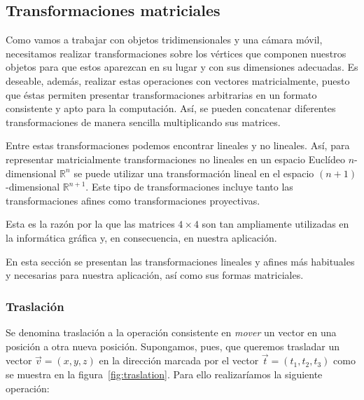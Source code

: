 \subsection{Transformaciones matriciales}
\label{makereference5.4.1}

Como vamos a trabajar con objetos tridimensionales y una cámara móvil,
necesitamos realizar transformaciones sobre los vértices que componen nuestros
objetos para que estos aparezcan en su lugar y con sus dimensiones adecuadas.
Es deseable, además, realizar estas operaciones con vectores matricialmente,
puesto que éstas permiten presentar transformaciones arbitrarias en un
formato consistente y apto para la computación. Así, se pueden concatenar
diferentes transformaciones de manera sencilla multiplicando sus matrices. 

Entre estas transformaciones podemos encontrar lineales y no lineales. Así, para
representar matricialmente transformaciones no lineales en un espacio Euclídeo
$n$-dimensional $\mathbb{R}^n$ se puede utilizar una transformación lineal en el
espacio $(n+1)$-dimensional $\mathbb{R}^{n+1}$. Este tipo de transformaciones
incluye tanto las transformaciones afines como transformaciones proyectivas.

Esta es la razón por la que las matrices $4 \times 4$ son tan ampliamente
utilizadas en la informática gráfica y, en consecuencia, en nuestra
aplicación.

En esta sección se presentan las transformaciones lineales y afines más
habituales y necesarias para nuestra aplicación, así como sus formas
matriciales. 

\subsubsection{Traslación}
\label{makereference5.4.1.1}

Se denomina traslación a la operación consistente en \textit{mover} un vector en
una posición a otra nueva posición. Supongamos, pues, que queremos trasladar un
vector $\overrightarrow{v} = (x,y,z)$ en la dirección marcada por el vector
$\overrightarrow{t} = (t_1, t_2, t_3)$ como se muestra en la
figura~\ref{fig:traslation}. Para ello realizaríamos la siguiente operación:

